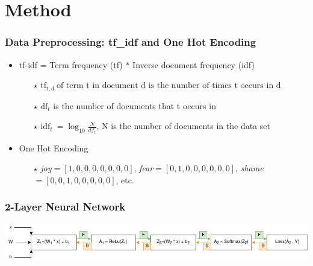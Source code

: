 \documentclass[aspectratio=169]{beamer}
\begin{document}
\section{Method}
\begin{frame}
\frametitle{Data Preprocessing: tf\_idf and One Hot Encoding}

\begin{itemize}

\item tf-idf = Term frequency (tf) $*$ Inverse document frequency (idf)

\begin{itemize}
\setlength\itemsep{0.4em}
\item [$\star$] $ \text{tf}_{t,d} \: \text{of term t in document d is the number of times t occurs in d} $
\item [$\star$] $\text{df}_t$ is the number of documents that t occurs in


\item [$\star$] $ \text{idf}_t \:=\log_{10}\frac{N}{df_t}$, N is the number of documents in the data set
\end{itemize}
\setlength\itemsep{0.8em}
\item One Hot Encoding

\begin{itemize}
\item [$\star$] \emph{joy}$=[1,0,0,0,0,0,0,0]$, \emph{fear}$=[0,1,0,0,0,0,0,0]$, \emph{shame}$=[0,0,1,0,0,0,0,0]$, etc.
\end{itemize}
\end{itemize}
\end{frame}

\begin{frame}
\frametitle{2-Layer Neural Network}

\includegraphics[scale=0.5]{Method_TeamLab.jpg}

\end{frame}




\end{document}
